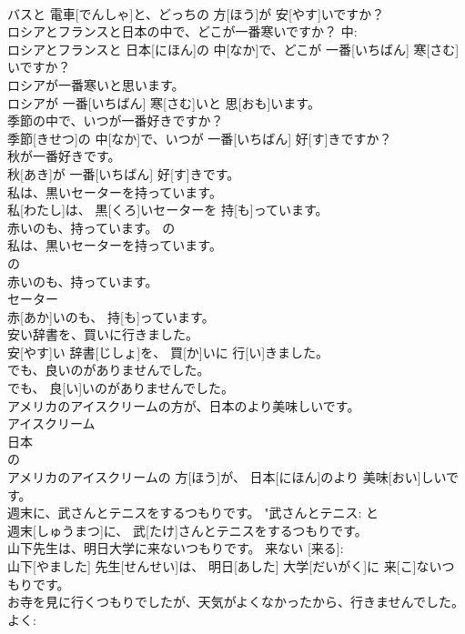 \documentclass[8pt]{extreport}
\begin{document}
\begin{CJK}{UTF8}{min}
\\	バスと 電車[でんしゃ]と、どっちの 方[ほう]が 安[やす]いですか？	
\\	ロシアとフランスと日本の中で、どこが一番寒いですか？	中: 
\\	ロシアとフランスと 日本[にほん]の 中[なか]で、どこが 一番[いちばん] 寒[さむ]いですか？	
\\	ロシアが一番寒いと思います。	
\\	ロシアが 一番[いちばん] 寒[さむ]いと 思[おも]います。	
\\	季節の中で、いつが一番好きですか？	
\\	季節[きせつ]の 中[なか]で、いつが 一番[いちばん] 好[す]きですか？	
\\	秋が一番好きです。	
\\	秋[あき]が 一番[いちばん] 好[す]きです。	
\\	私は、黒いセーターを持っています。	
\\	私[わたし]は、 黒[くろ]いセーターを 持[も]っています。	
\\	赤いのも、持っています。	の 
\\	私は、黒いセーターを持っています。
\\	の 
\\	赤いのも、持っています。
\\	セーター 
\\	赤[あか]いのも、 持[も]っています。	
\\	安い辞書を、買いに行きました。	
\\	安[やす]い 辞書[じしょ]を、 買[か]いに 行[い]きました。	
\\	でも、良いのがありませんでした。	
\\	でも、 良[い]いのがありませんでした。	
\\	アメリカのアイスクリームの方が、日本のより美味しいです。	
\\	アイスクリーム 
\\	日本 
\\	の 
\\	アメリカのアイスクリームの 方[ほう]が、 日本[にほん]のより 美味[おい]しいです。	
\\	週末に、武さんとテニスをするつもりです。	"武さんとテニス: と 
\\	週末[しゅうまつ]に、 武[たけ]さんとテニスをするつもりです。	
\\	山下先生は、明日大学に来ないつもりです。	来ない [来る]: 
\\	山下[やました] 先生[せんせい]は、 明日[あした] 大学[だいがく]に 来[こ]ないつもりです。	
\\	お寺を見に行くつもりでしたが、天気がよくなかったから、行きませんでした。	よく: 

\end{CJK}
\end{document}
